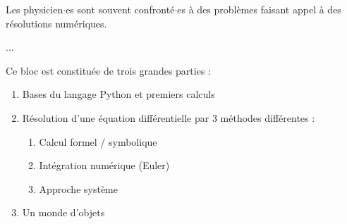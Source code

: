 Les physicien$\cdot$es sont souvent confronté$\cdot$es à des problèmes faisant appel à des résolutions numériques. 

...

\medskip

Ce bloc est constituée de trois grandes parties :

\begin{enumerate}
	\item Bases du langage Python et premiers calculs
	\item Résolution d'une équation différentielle par 3 méthodes différentes :
	\begin{enumerate}
		\item Calcul formel / symbolique
		\item Intégration numérique (Euler)
		\item Approche système
	\end{enumerate}
	\item Un monde d'objets
\end{enumerate}
